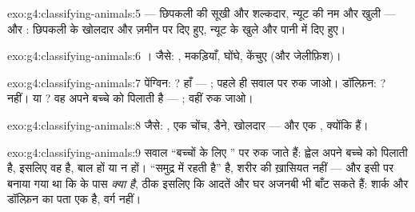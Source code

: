 \begin{solution}{exo:g4:classifying-animals:5}
 --- छिपकली की सूखी और शल्कदार, न्यूट की नम और खुली --- और :
छिपकली के खोलदार और ज़मीन पर दिए हुए, न्यूट के खुले और पानी में दिए
हुए।
\end{solution}

\begin{solution}{exo:g4:classifying-animals:6}
। जैसे: , मकड़ियाँ, घोंघे, केंचुए (और जेलीफ़िश)।
\end{solution}

\begin{solution}{exo:g4:classifying-animals:7}
पेंग्विन: ? हाँ --- ; पहले ही सवाल पर रुक जाओ। डॉल्फ़िन: ?
नहीं।  या ? वह अपने बच्चे को  पिलाती है --- ; वहीं रुक
जाओ।
\end{solution}

\begin{solution}{exo:g4:classifying-animals:8}
जैसे: , एक चोंच, डैने, खोलदार  --- और एक , क्योंकि 
 हैं।
\end{solution}

\begin{solution}{exo:g4:classifying-animals:9}
सवाल ``बच्चों के लिए '' पर रुक जाते हैं: ह्वेल अपने बच्चे को 
पिलाती है, इसलिए वह  है, बाल हों या न हों। ``समुद्र में रहती
है''  है, शरीर की ख़ासियत नहीं --- और  इसी पर बनाया गया था
कि  के पास \emph{क्या है}, ठीक इसलिए कि आदतें और घर अजनबी भी बाँट
सकते हैं: शार्क और डॉल्फ़िन का पता एक है, वर्ग नहीं।
\end{solution}

